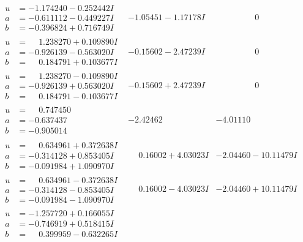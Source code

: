 \documentclass[1p]{elsarticle_modified}
\theoremstyle{definition}
\begin{document}
$$\begin{array}{c|c|c}
\begin{aligned}
u &= -1.174240 - 0.252442 I \\
a &= -0.611112 - 0.449227 I \\
b &= -0.396824 + 0.716749 I\end{aligned}
 & -1.05451 - 1.17178 I & \phantom{-0.000000 } 0 \\ \hline\begin{aligned}
u &= \phantom{-}1.238270 + 0.109890 I \\
a &= -0.926139 - 0.563020 I \\
b &= \phantom{-}0.184791 + 0.103677 I\end{aligned}
 & -0.15602 - 2.47239 I & \phantom{-0.000000 } 0 \\ \hline\begin{aligned}
u &= \phantom{-}1.238270 - 0.109890 I \\
a &= -0.926139 + 0.563020 I \\
b &= \phantom{-}0.184791 - 0.103677 I\end{aligned}
 & -0.15602 + 2.47239 I & \phantom{-0.000000 } 0 \\ \hline\begin{aligned}
u &= \phantom{-}0.747450\phantom{ +0.000000I} \\
a &= -0.637437\phantom{ +0.000000I} \\
b &= -0.905014\phantom{ +0.000000I}\end{aligned}
 & -2.42462\phantom{ +0.000000I} & -4.01110\phantom{ +0.000000I} \\ \hline\begin{aligned}
u &= \phantom{-}0.634961 + 0.372638 I \\
a &= -0.314128 + 0.853405 I \\
b &= -0.091984 + 1.090970 I\end{aligned}
 & \phantom{-}0.16002 + 4.03023 I & -2.04460 - 10.11479 I \\ \hline\begin{aligned}
u &= \phantom{-}0.634961 - 0.372638 I \\
a &= -0.314128 - 0.853405 I \\
b &= -0.091984 - 1.090970 I\end{aligned}
 & \phantom{-}0.16002 - 4.03023 I & -2.04460 + 10.11479 I \\ \hline\begin{aligned}
u &= -1.257720 + 0.166055 I \\
a &= -0.746919 + 0.518415 I \\
b &= \phantom{-}0.399959 - 0.632265 I\end{aligned}

\end{array}$$
\end{document}
